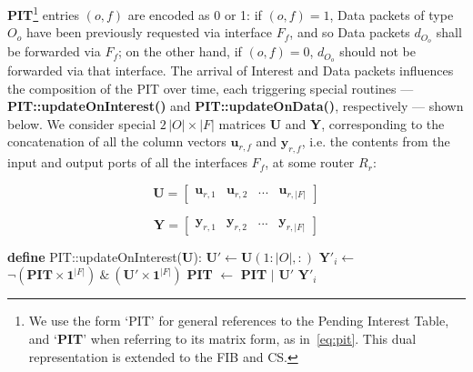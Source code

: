 \textbf{PIT}\footnote{We use the form `PIT' for general references to the Pending 
Interest Table, and `\textbf{PIT}' when referring to its matrix form, as in~\ref{eq:pit}. 
This dual representation is extended to the FIB and CS.} entries 
$(o,f)$ are encoded as 0 or 1: if $(o,f) = 1$, Data 
packets of 
type $O_o$ have been previously requested via interface $F_f$, and so Data 
packets $d_{O_o}$ shall be forwarded via $F_f$; on the other hand, 
if $(o,f) = 0$, $d_{O_o}$ should not be forwarded via that 
interface. The arrival of Interest and Data packets influences the composition of 
the PIT over time, each triggering special routines --- \textbf{PIT::updateOnInterest()} and 
\textbf{PIT::updateOnData()}, respectively --- shown below. We consider 
special $2\,|O| \times |F|$ matrices \textbf{U} and \textbf{Y}, corresponding to the concatenation of 
all the column vectors $\textbf{u}_{r,f}$ and $\textbf{y}_{r,f}$, i.e. the contents from the input and output ports 
of all the interfaces $F_f$, at some router $R_r$:

\begin{equation}
\textbf{U} = \begin{bmatrix} \textbf{u}_{r,1} & \textbf{u}_{r,2} & ... & \textbf{u}_{r,|F|} \end{bmatrix}
    \label{eq:a}
\end{equation}

\begin{equation}
\textbf{Y} = \begin{bmatrix} \textbf{y}_{r,1} & \textbf{y}_{r,2} & ... & \textbf{y}_{r,|F|} \end{bmatrix}
    \label{eq:b}
\end{equation}\shortvertbreak

\begin{algorithmic}[1]

\State \textbf{define} PIT::updateOnInterest(\textbf{U}):
\State
    \State $\textbf{U}' \leftarrow \textbf{U}(1:|O|,:)$
    \State $\textbf{Y}'_i \leftarrow$ $\neg(\textbf{PIT} \times \textbf{1}^{|F|}) \ \& \ (\textbf{U}' \times \textbf{1}^{|F|})$
    \State \textbf{PIT} $\leftarrow$ \textbf{PIT} $|$ $\textbf{U}'$ 
    \State \Return $\textbf{Y}'_i$

\end{algorithmic}\shortvertbreak

